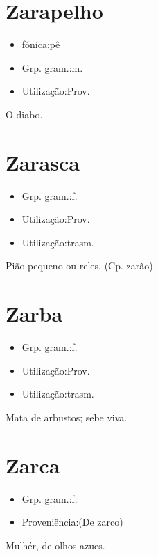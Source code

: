 \section{Zarapelho}
\begin{itemize}
\item {fónica:pê}
\end{itemize}
\begin{itemize}
\item {Grp. gram.:m.}
\end{itemize}
\begin{itemize}
\item {Utilização:Prov.}
\end{itemize}
O diabo.
\section{Zarasca}
\begin{itemize}
\item {Grp. gram.:f.}
\end{itemize}
\begin{itemize}
\item {Utilização:Prov.}
\end{itemize}
\begin{itemize}
\item {Utilização:trasm.}
\end{itemize}
Pião pequeno ou reles.
(Cp. \textunderscore zarão\textunderscore )
\section{Zarba}
\begin{itemize}
\item {Grp. gram.:f.}
\end{itemize}
\begin{itemize}
\item {Utilização:Prov.}
\end{itemize}
\begin{itemize}
\item {Utilização:trasm.}
\end{itemize}
Mata de arbustos; sebe viva.
\section{Zarca}
\begin{itemize}
\item {Grp. gram.:f.}
\end{itemize}
\begin{itemize}
\item {Proveniência:(De \textunderscore zarco\textunderscore )}
\end{itemize}
Mulhér, de olhos azues.
